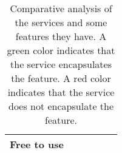 \begin{table}[h]
{\begin{tabular}{clllll}
            \cellcolor[HTML]{EFEFEF}\textbf{Free to use} &
            \multicolumn{1}{l}{\cellcolor[HTML]{67FD9A}} &
            \multicolumn{1}{l}{\cellcolor[HTML]{67FD9A}} &
            \multicolumn{1}{l}{\cellcolor[HTML]{67FD9A}} &
            \multicolumn{1}{l}{\cellcolor[HTML]{FD6864}} &
            \\ \bottomrule
        \end{tabular}%
    }
    \caption{Comparative analysis of the services and some features they have.
    A green color indicates that the service encapsulates the feature.
    A red color indicates that the service does not encapsulate the feature.}\label{tab:comparative-analysis}
\end{table}
